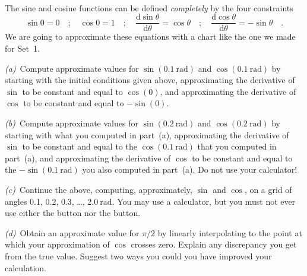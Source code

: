 \documentclass[12pt]{article}
\newcounter{problem}
\begin{document}
\paragraph{\problemname~\theproblem}

The sine and cosine functions can be defined \emph{completely} by the
four constraints
\begin{equation}
\sin 0=0 \quad ;\quad
\cos 0=1 \quad ;\quad
\frac{\mathrm{d}\sin\theta}{\mathrm{d}\theta}=\cos\theta \quad ;\quad
\frac{\mathrm{d}\cos\theta}{\mathrm{d}\theta}=-\sin\theta \quad .
\nonumber
\end{equation}
We are going to approximate these equations with a chart like the one
we made for \problemname Set~1.

\textsl{(a)}~Compute approximate values for $\sin (0.1~\mathrm{rad})$
and $\cos (0.1~\mathrm{rad})$ by starting with the initial conditions
given above, approximating the derivative of $\sin$ to be constant and
equal to $\cos (0)$, and approximating the derivative of $\cos$ to be
constant and equal to $-\sin (0)$.

\textsl{(b)}~Compute approximate values for $\sin (0.2~\mathrm{rad})$
and $\cos (0.2~\mathrm{rad})$ by starting with what you computed in
part~(a), approximating the derivative of $\sin$ to be constant and
equal to the $\cos (0.1~\mathrm{rad})$ that you computed in part~(a),
and approximating the derivative of $\cos$ to be constant and equal to
the $-\sin (0.1~\mathrm{rad})$ you also computed in part~(a).  Do not
use your calculator!

\textsl{(c)}~Continue the above, computing, approximately, $\sin$ and
$\cos$, on a grid of angles 0.1, 0.2, 0.3, \ldots, $2.0~\mathrm{rad}$.
You may use a calculator, but you must not ever use either the
\fbox{$\sin$} button nor the \fbox{$\cos$} button.

\textsl{(d)}~Obtain an approximate value for $\pi/2$ by linearly
interpolating to the point at which your approximation of $\cos$
crosses zero.  Explain any discrepancy you get from the true value.
Suggest two ways you could you have improved your calculation.

\paragraph{\problemname~\theproblem}
\end{document}
